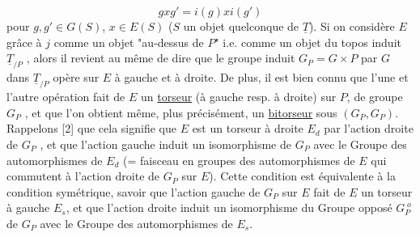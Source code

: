 \begin{equation*}
gxg' = i(g)xi(g')
\end{equation*}
pour $g,g' \in G(S)$, $x \in E(S)$ ($S$ un objet quelconque de $\underline{T}$). Si on considère $E$ grâce à $j$ comme un objet "au-dessus de $P$" i.e. comme un objet du topos induit $\underline{T}_{/P}$ , alors il revient au même de dire que le groupe induit $G_P = G \times P$ par $G$ dans $\underline{T}_{/P}$ opère sur $E$ à gauche et à droite. De plus, il est bien connu que l'une et l'autre opération fait de $E$ un \underline{torseur} (à gauche resp. à droite) sur $P$, de groupe $G_P$ , et que l'on obtient même, plus précisément, un \underline{bitorseur} sous $(G_P,G_P)$. Rappelons [2] que cela signifie que $E$ est un torseur à droite $E_d$ par l'action droite de $G_P$ , et que l'action gauche induit un isomorphisme de $G_P$ avec le Groupe des automorphismes de $E_d$ (= faisceau en groupes des automorphismes de $E$ qui commutent à l'action droite de $G_P$ sur $E$). Cette condition est équivalente à la condition symétrique, savoir que l'action gauche de $G_P$ sur $E$ fait de $E$ un torseur à gauche $E_s$, et que l'action droite induit un isomorphisme du Groupe opposé $G_P^{\;o}$ de $G_P$ avec le Groupe des automorphismes de $E_s$.

